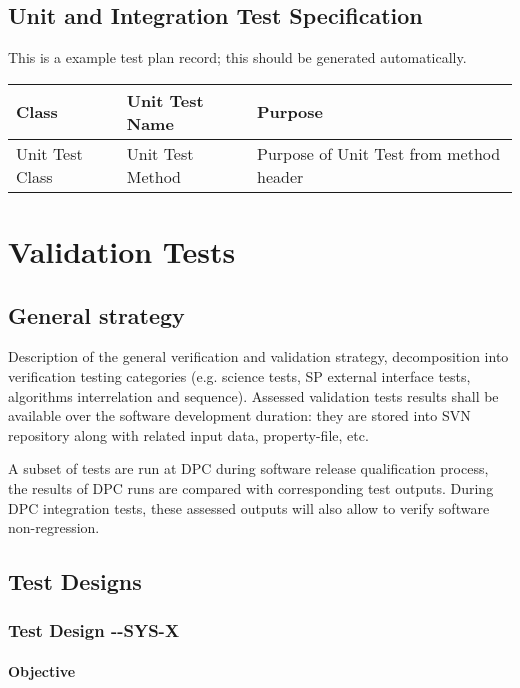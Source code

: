 \documentclass[CUx,lsstdraft,STP]{lsstdoc}
\begin{document}
\subsection{Unit and Integration Test Specification}

This is a example test plan record; this should be generated automatically.

\begin{longtable} {|p{}|p{}|p{}|}\hline
{\bf Class} & {\bf Unit Test Name} & {\bf Purpose}  \\\hline
Unit Test Class & 
Unit Test Method & 
Purpose of Unit Test from method header \\\hline
\end{longtable}

\section{Validation Tests}

\subsection{General strategy}

Description of the general verification and validation strategy, decomposition into verification testing categories (e.g. science tests, SP external interface tests, algorithms interrelation and sequence). Assessed validation tests results shall be available over the software development duration: they are stored into SVN repository along with related input data, property-file, etc.

A subset of tests are run at DPC during software release qualification process, the results of DPC runs are compared with corresponding test outputs. During DPC integration tests, these assessed outputs will also allow to verify software non-regression.
 
\subsection{Test Designs}

\subsubsection{Test Design \CU-\product-SYS-X}

\paragraph{Objective}
\end{document}
